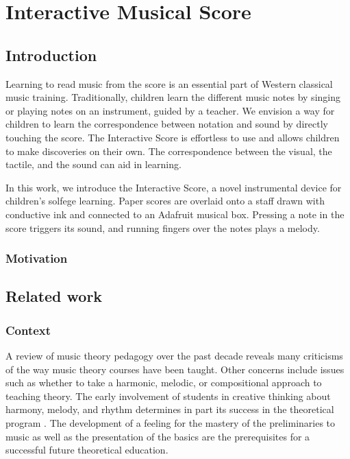 \chapter{Interactive Musical Score}

\section{Introduction}

Learning to read music from the score is an essential part of Western classical music
training. Traditionally, children learn the different music notes by singing or playing
notes on an instrument, guided by a teacher. We envision a way for children to learn
the correspondence between notation and sound by directly touching the score.
The Interactive Score is effortless to use and allows children to make discoveries on
their own. The correspondence between the visual, the tactile, and the sound can aid
in learning.

In this work, we introduce the Interactive Score, a novel instrumental device for children's solfege
learning. Paper scores are overlaid onto a staff drawn with conductive ink and
connected to an Adafruit musical box. Pressing a note in the score triggers its sound,
and running fingers over the notes plays a melody.


\subsection*{Motivation}

\section{Related work}

\subsection{Context} 

A review of music theory pedagogy over the past decade reveals many criticisms of the way music theory courses have been taught. Other concerns include issues such as whether to take a harmonic, melodic, or compositional approach to teaching theory. The early involvement of students in creative thinking about harmony, melody, and rhythm determines in part its success in the theoretical program \cite{bland1977college}. The development of a feeling for the mastery of the preliminaries to music as well as the presentation of the basics are the prerequisites for a successful future theoretical education.

